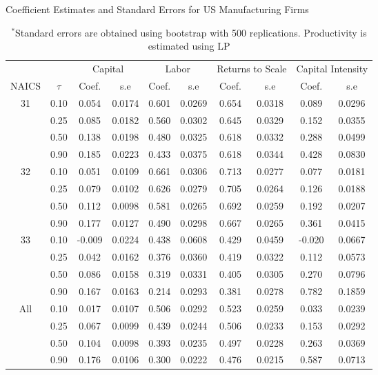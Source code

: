 \documentclass[11pt]{article}
\begin{document}
\begin{table}[H]
\centering
\caption{Coefficient Estimates and Standard Errors for US Manufacturing Firms}
\begin{tabular}{cccccccccc}
  \hline\hline & & \multicolumn{2}{c}{Capital}  & \multicolumn{2}{c}{Labor} & \multicolumn{2}{c}{Returns to Scale} & \multicolumn{2}{c}{Capital Intensity}\\ \cmidrule(lr){3-4} \cmidrule(lr){5-6} \cmidrule(lr){7-8} \cmidrule(lr){9-10}NAICS & $\tau$ & Coef. & s.e & Coef. & s.e & Coef. & s.e & Coef. & s.e \\ 
  \hline
31 & 0.10 & 0.054 & 0.0174 & 0.601 & 0.0269 & 0.654 & 0.0318 & 0.089 & 0.0296 \\ 
   & 0.25 & 0.085 & 0.0182 & 0.560 & 0.0302 & 0.645 & 0.0329 & 0.152 & 0.0355 \\ 
   & 0.50 & 0.138 & 0.0198 & 0.480 & 0.0325 & 0.618 & 0.0332 & 0.288 & 0.0499 \\ 
   & 0.90 & 0.185 & 0.0223 & 0.433 & 0.0375 & 0.618 & 0.0344 & 0.428 & 0.0830 \\ 
  32 & 0.10 & 0.051 & 0.0109 & 0.661 & 0.0306 & 0.713 & 0.0277 & 0.077 & 0.0181 \\ 
   & 0.25 & 0.079 & 0.0102 & 0.626 & 0.0279 & 0.705 & 0.0264 & 0.126 & 0.0188 \\ 
   & 0.50 & 0.112 & 0.0098 & 0.581 & 0.0265 & 0.692 & 0.0259 & 0.192 & 0.0207 \\ 
   & 0.90 & 0.177 & 0.0127 & 0.490 & 0.0298 & 0.667 & 0.0265 & 0.361 & 0.0415 \\ 
  33 & 0.10 & -0.009 & 0.0224 & 0.438 & 0.0608 & 0.429 & 0.0459 & -0.020 & 0.0667 \\ 
   & 0.25 & 0.042 & 0.0162 & 0.376 & 0.0360 & 0.419 & 0.0322 & 0.112 & 0.0573 \\ 
   & 0.50 & 0.086 & 0.0158 & 0.319 & 0.0331 & 0.405 & 0.0305 & 0.270 & 0.0796 \\ 
   & 0.90 & 0.167 & 0.0163 & 0.214 & 0.0293 & 0.381 & 0.0278 & 0.782 & 0.1859 \\ 
  All & 0.10 & 0.017 & 0.0107 & 0.506 & 0.0292 & 0.523 & 0.0259 & 0.033 & 0.0239 \\ 
   & 0.25 & 0.067 & 0.0099 & 0.439 & 0.0244 & 0.506 & 0.0233 & 0.153 & 0.0292 \\ 
   & 0.50 & 0.104 & 0.0098 & 0.393 & 0.0235 & 0.497 & 0.0228 & 0.263 & 0.0369 \\ 
   & 0.90 & 0.176 & 0.0106 & 0.300 & 0.0222 & 0.476 & 0.0215 & 0.587 & 0.0713 \\ 
   \hline
\end{tabular}
\caption*{\footnotesize $^{*}$Standard errors are obtained using bootstrap with 500 replications. Productivity is estimated using LP}
\label{USestLP}
\end{table}
\end{document}
